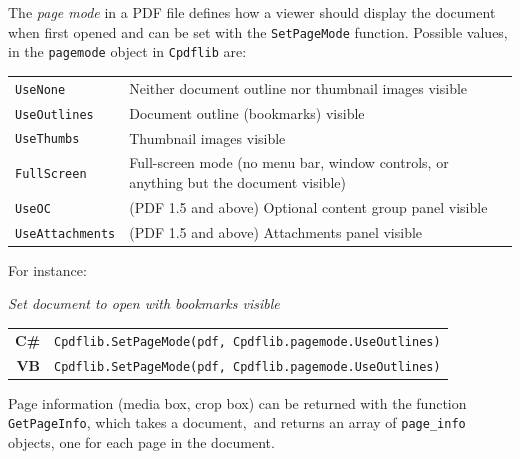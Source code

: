 \documentclass[a4paper]{memoir}
\begin{document}
  The \textit{page mode} in a PDF file defines how a viewer should display the
document when first opened and can be set with the \verb!SetPageMode! function. Possible values, in the \verb!pagemode! object in \verb!Cpdflib! are:
\begin{framed}
  \begin{tabular}{ll}
    \texttt{UseNone} & \vspace{2mm} \parbox{8cm}{Neither document outline nor thumbnail images visible} \\
    \texttt{UseOutlines} & \vspace{2mm} \parbox{8cm}{Document outline (bookmarks) visible} \\
    \texttt{UseThumbs} & \vspace{2mm} \parbox{8cm}{Thumbnail images visible} \\
    \texttt{FullScreen} & \vspace{2mm} \parbox{8cm}{Full-screen mode (no menu bar, window controls, or anything but the document visible)} \\
    \texttt{UseOC} & \vspace{2mm} \parbox{8cm}{(PDF 1.5 and above) Optional content group panel visible} \\
    \texttt{UseAttachments} & \vspace{2mm} \parbox{8cm}{(PDF 1.5 and above) Attachments panel visible}
  \end{tabular}
\end{framed}
For instance:

\begin{framed}
\noindent\textit{Set document to open with bookmarks visible}

\vspace{2mm}
\noindent\begin{tabular}{rl}
\small\sffamily\textbf{C\#} &
\begin{minipage}{4in}
\small\verb!Cpdflib.SetPageMode(pdf, Cpdflib.pagemode.UseOutlines)!
\end{minipage}\\[5mm]
\small\sffamily\textbf{VB} &
\begin{minipage}{4in}
\small\verb!Cpdflib.SetPageMode(pdf, Cpdflib.pagemode.UseOutlines)!
\end{minipage}\\[5mm]
\end{tabular}
\end{framed}

Page information (media box, crop box) can be returned with the function \verb!GetPageInfo!, which takes a document, and returns an array of \verb!page_info! objects, one for each page in the document.
\end{document}
